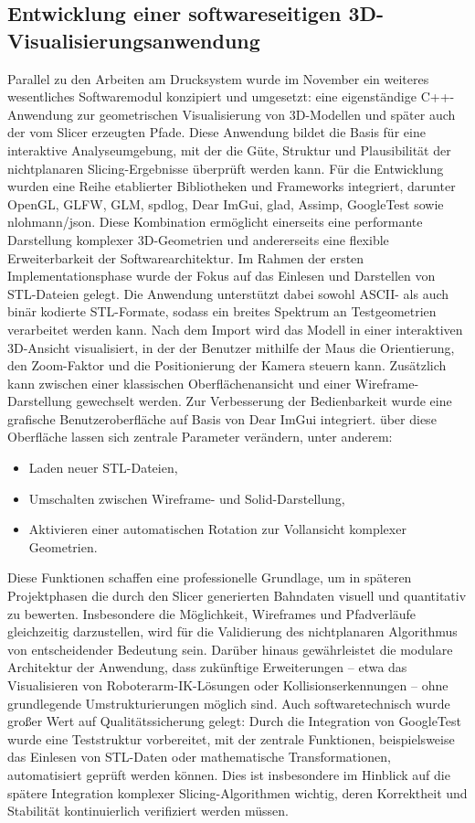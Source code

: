 \documentclass[
	paper=a4,
	fontsize=11pt,
	parskip=half,
	headings=normal,
	bibliography=totoc,
	listof=totoc
]{scrartcl}
\begin{document}
\subsection{Entwicklung einer softwareseitigen 3D-Visualisierungsanwendung}
Parallel zu den Arbeiten am Drucksystem wurde im November ein weiteres wesentliches Softwaremodul konzipiert und umgesetzt: eine eigenständige C++-Anwendung zur geometrischen Visualisierung von 3D-Modellen und später auch der vom Slicer erzeugten Pfade.
Diese Anwendung bildet die Basis für eine interaktive Analyseumgebung, mit der die Güte, Struktur und Plausibilität der nichtplanaren Slicing-Ergebnisse überprüft werden kann.
Für die Entwicklung wurden eine Reihe etablierter Bibliotheken und Frameworks integriert, darunter OpenGL, GLFW, GLM, spdlog, Dear ImGui, glad, Assimp, GoogleTest sowie nlohmann/json.
Diese Kombination ermöglicht einerseits eine performante Darstellung komplexer 3D-Geometrien und andererseits eine flexible Erweiterbarkeit der Softwarearchitektur.
Im Rahmen der ersten Implementationsphase wurde der Fokus auf das Einlesen und Darstellen von STL-Dateien gelegt.
Die Anwendung unterstützt dabei sowohl ASCII- als auch binär kodierte STL-Formate, sodass ein breites Spektrum an Testgeometrien verarbeitet werden kann.
Nach dem Import wird das Modell in einer interaktiven 3D-Ansicht visualisiert, in der der Benutzer mithilfe der Maus die Orientierung, den Zoom-Faktor und die Positionierung der Kamera steuern kann.
Zusätzlich kann zwischen einer klassischen Oberflächenansicht und einer Wireframe-Darstellung gewechselt werden.
Zur Verbesserung der Bedienbarkeit wurde eine grafische Benutzeroberfläche auf Basis von Dear ImGui integriert.
über diese Oberfläche lassen sich zentrale Parameter verändern, unter anderem:

\begin{itemize}
    \item Laden neuer STL-Dateien,
    \item Umschalten zwischen Wireframe- und Solid-Darstellung,
    \item Aktivieren einer automatischen Rotation zur Vollansicht komplexer Geometrien.
\end{itemize}

Diese Funktionen schaffen eine professionelle Grundlage, um in späteren Projektphasen die durch den Slicer generierten Bahndaten visuell und quantitativ zu bewerten.
Insbesondere die Möglichkeit, Wireframes und Pfadverläufe gleichzeitig darzustellen, wird für die Validierung des nichtplanaren Algorithmus von entscheidender Bedeutung sein.
Darüber hinaus gewährleistet die modulare Architektur der Anwendung, dass zukünftige Erweiterungen -- etwa das Visualisieren von Roboterarm-IK-Lösungen oder Kollisionserkennungen -- ohne grundlegende Umstrukturierungen möglich sind.
Auch softwaretechnisch wurde großer Wert auf Qualitätssicherung gelegt: Durch die Integration von GoogleTest wurde eine Teststruktur vorbereitet, mit der zentrale Funktionen, beispielsweise das Einlesen von STL-Daten oder mathematische Transformationen, automatisiert geprüft werden können.
Dies ist insbesondere im Hinblick auf die spätere Integration komplexer Slicing-Algorithmen wichtig, deren Korrektheit und Stabilität kontinuierlich verifiziert werden müssen.
\end{document}
